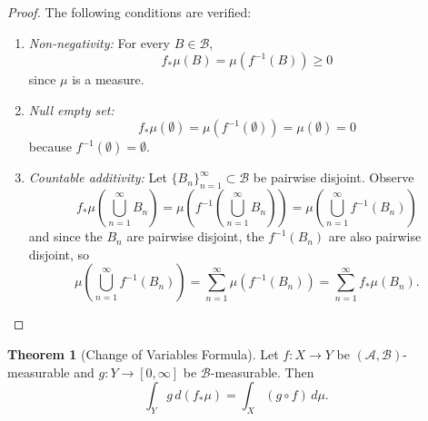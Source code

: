 \documentclass[12pt]{article}
\theoremstyle{definition}
\newtheorem{theorem}{Theorem}[section]
\begin{document}
\begin{proof}
The following conditions are verified:
\begin{enumerate}
    \item \textit{Non-negativity:} For every $B \in \mathscr{B}$, 
    \[
    f_{*}\mu(B) = \mu\left( f^{-1}(B) \right) \geq 0
    \]
    since $\mu$ is a measure.
    \item \textit{Null empty set:} 
    \[
    f_{*}\mu(\emptyset) = \mu(f^{-1}(\emptyset)) = \mu(\emptyset) = 0
    \]
    because $f^{-1}(\emptyset) = \emptyset$.
    \item \textit{Countable additivity:} Let $\{B_n\}_{n=1}^\infty \subset \mathscr{B}$ be pairwise disjoint. Observe
    \[
    f_{*}\mu\left( \bigcup_{n=1}^\infty B_n \right) = \mu \left( f^{-1}\left( \bigcup_{n=1}^\infty B_n \right) \right ) = \mu \left( \bigcup_{n=1}^\infty f^{-1}(B_n) \right )
    \]
    and since the $B_n$ are pairwise disjoint, the $f^{-1}(B_n)$ are also pairwise disjoint, so 
    \[
    \mu \left( \bigcup_{n=1}^\infty f^{-1}(B_n) \right ) = \sum_{n=1}^\infty \mu(f^{-1}(B_n)) = \sum_{n=1}^\infty f_{*}\mu (B_n).
    \]
\end{enumerate}
\end{proof}

\begin{theorem}[Change of Variables Formula]
Let $f: X \to Y$ be $(\mathscr{A}, \mathscr{B})$-measurable and $g: Y \to [0, \infty]$ be $\mathscr{B}$-measurable. Then 
\[
\int_Y g \, d(f_{*}\mu) = \int_X (g \circ f) \, d\mu.
\]
\end{theorem}
\end{document}
